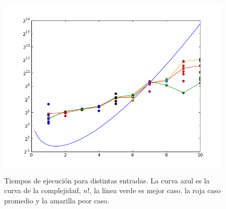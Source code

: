 \documentclass[10pt,a4paper]{article}
\begin{document}
\begin{figure}[h!]
  \centering
  \includegraphics[width=12cm, height=9cm]{HameTime}
  \caption{Tiempos de ejecución para distintas entradas. La curva azul es la curva de la complejidad, $n!$, la línea verde es mejor caso, la roja caso promedio y la amarilla peor caso.}
\end{figure}
\end{document}
